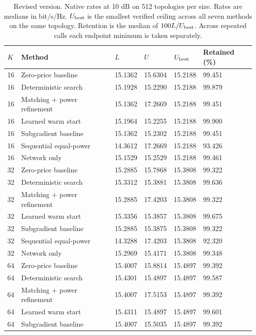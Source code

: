 \documentclass[10pt,letterpaper]{article}
\begin{document}
\begin{table}[p]\color{blue}\centering\small
\setlength{\tabcolsep}{4pt}
\caption{Revised version. Native rates at 10 dB on 512 topologies per size. Rates are medians in bit/s/Hz. $U_{\rm best}$ is the smallest verified ceiling across all seven methods on the same topology. Retention is the median of $100 L/U_{\rm best}$. Across repeated calls each endpoint minimum is taken separately.}\label{supp:rates}
\begin{tabular}{llllll}\toprule
$K$ & Method & $L$ & $U$ & $U_{\rm best}$ & Retained (\%)\\
\midrule
16 & Zero-price baseline & 15.1362 & 15.6304 & 15.2188 & 99.451\\
16 & Deterministic search & 15.1928 & 15.2290 & 15.2188 & 99.879\\
16 & Matching + power refinement & 15.1362 & 17.2669 & 15.2188 & 99.451\\
16 & Learned warm start & 15.1964 & 15.2255 & 15.2188 & 99.900\\
16 & Subgradient baseline & 15.1362 & 15.2302 & 15.2188 & 99.451\\
16 & Sequential equal-power & 14.3612 & 17.2669 & 15.2188 & 93.426\\
16 & Network only & 15.1529 & 15.2529 & 15.2188 & 99.461\\
32 & Zero-price baseline & 15.2885 & 15.7868 & 15.3808 & 99.322\\
32 & Deterministic search & 15.3312 & 15.3881 & 15.3808 & 99.636\\
32 & Matching + power refinement & 15.2885 & 17.4203 & 15.3808 & 99.322\\
32 & Learned warm start & 15.3356 & 15.3857 & 15.3808 & 99.675\\
32 & Subgradient baseline & 15.2885 & 15.3875 & 15.3808 & 99.322\\
32 & Sequential equal-power & 14.3288 & 17.4203 & 15.3808 & 92.320\\
32 & Network only & 15.2969 & 15.4171 & 15.3808 & 99.348\\
64 & Zero-price baseline & 15.4007 & 15.8814 & 15.4897 & 99.392\\
64 & Deterministic search & 15.4301 & 15.4897 & 15.4897 & 99.587\\
64 & Matching + power refinement & 15.4007 & 17.5153 & 15.4897 & 99.392\\
64 & Learned warm start & 15.4311 & 15.4897 & 15.4897 & 99.601\\
64 & Subgradient baseline & 15.4007 & 15.5035 & 15.4897 & 99.392\\

\end{tabular}
\end{table}
\end{document}
